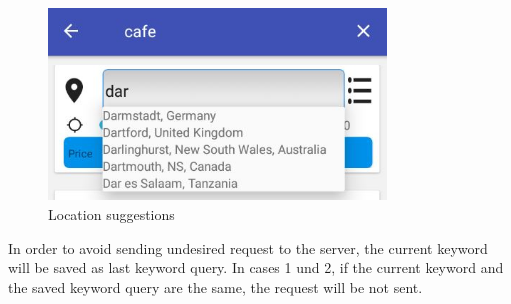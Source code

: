 \begin{figure}[htbp]
	\includegraphics[width=0.8\textwidth]{images/suggestedlocations.jpg}
	\centering
	\caption[]{Location suggestions}
	\label{fig:locationSuggestions}
\end{figure} 
In order to avoid sending undesired request to the server, the current keyword will be saved as last keyword query. In cases 1 und 2, if the current keyword and the saved keyword query are the same, the request will be not sent. 

